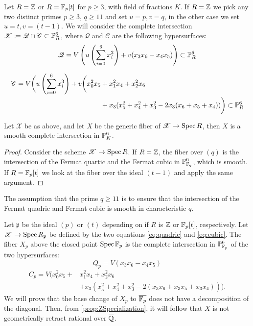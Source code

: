 Let $R = \Z$ or $R=\F_p[t]$ for $p \geq 3$, with field of fractions $K$. If $R=\Z$ we pick any two distinct primes $p \geq 3$, $q \geq 11$ and set $u=p,v=q$, in the other case we set $u=t,v=(t-1)$. We will consider the complete intersection $\mathscr{X} \coloneqq \mathscr{Q} \cap \mathscr{C} \subset \P_{R}^6$, where $\mathscr{Q}$ and $\mathscr{C}$ are the following hypersurfaces:
\begin{equation}
  \label{eq:quadric}
   \mathscr{Q} =V\left(  u \left(\sum_{i=0}^6 x_i^2 \right) + v(x_3x_6-x_4x_5) \right)  \subset \P_{R}^6
\end{equation}

\begin{align}
  \label{eq:cubic}
  \mathscr{C} = V\biggl( u \left(\sum_{i=0}^6 x_i^3 \right) + v\biggl(x_0^2x_5 &+ x_1^2x_4 + x_2^2x_6 \nonumber \\ &+ x_3(x_5^2+x_4^2+x_3^2 -2x_3(x_6 + x_5 + x_4)) \biggr) \subset \P_{R}^6
\end{align}

\begin{lemma}
  Let $\mathscr{X}$ be as above, and let $X$ be the generic fiber of $\mathscr{X} \to \Spec R$, then $X$ is a smooth complete intersection in $\P_{K}^6$.
\end{lemma}
\begin{proof}
  Consider the scheme $\mathscr{X} \to \Spec R$.  If $R=\Z$, the fiber over $(q)$ is the intersection of the Fermat quartic and the Fermat cubic in $\P_{\F_q }^6$, which is smooth. If $R=\F_p[t]$ we look at the fiber over the ideal $(t-1)$ and apply the same argument.
\end{proof}
\begin{remark}
\label{rmk:Characteristics}
  The assumption that the prime $q \geq 11$ is to ensure that the intersection of the Fermat quadric and Fermat cubic is smooth in characteristic $q$.
\end{remark}


Let $\mathfrak{p}$ be the ideal $(p)$ or $(t)$ depending on if $R$ is $\Z$ or $\F_p[t]$, respectively. Let $\mathscr{X} \to \Spec R_{\mathfrak{p}}$ be defined by the two equations \eqref{eq:quadric} and \eqref{eq:cubic}. The fiber $X_p$ above the closed point $\Spec \F_p$ is the complete intersection in $\P^6_{\F_p}$ of the two hypersurfaces:
\begin{equation}
  \label{eq:Qquadric}
  Q_p = V(x_3x_6-x_4x_5)
\end{equation}
\begin{align}
  \label{eq:Qqubic}
  C_p = V \biggl(x_0^2x_5 + &x_1^2x_4 + x_2^2x_6 \nonumber \\ &+ x_3(x_5^2+x_4^2+x_3^2 -2(x_3x_6 + x_3x_5 + x_3x_4)) \biggr).
\end{align}
We will prove that the base change of $X_p$ to $\overline{\F_p}$ does not have a decomposition of the diagonal. Then, from \cref{prop:ZSpecialization}, it will follow that $X$ is not geometrically retract rational over $\overline{\Q}$.

